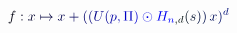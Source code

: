 \documentclass[12pt]{article}
\begin{document}
\makeatletter
\renewcommand*{\@textcolor}[3]{%
  \protect\leavevmode
  \begingroup
    \color#1{#2}#3%
  \endgroup
}
\makeatother
\begin{displaymath}
\mathcolor[RGB]{0,0,15}{f} \mathcolor[RGB]{0,0,30}{:} \mathcolor[RGB]{0,0,45}{x} \mathcolor[RGB]{0,0,60}{\mapsto} \mathcolor[RGB]{0,0,75}{x} \mathcolor[RGB]{0,0,90}{+} \mathcolor[RGB]{0,0,105}{(} \mathcolor[RGB]{0,0,120}{(} \mathcolor[RGB]{0,0,135}{U} \mathcolor[RGB]{0,0,150}{(} \mathcolor[RGB]{0,0,165}{p} \mathcolor[RGB]{0,0,180}{,} \mathcolor[RGB]{0,0,195}{\Pi} \mathcolor[RGB]{0,0,210}{)} \mathcolor[RGB]{0,0,225}{\odot} \mathcolor[RGB]{0,0,240}{H} _ { \mathcolor[RGB]{0,0,255}{n} \mathcolor[RGB]{0,15,0}{,} \mathcolor[RGB]{0,15,15}{d} } \mathcolor[RGB]{0,15,30}{(} \mathcolor[RGB]{0,15,45}{s} \mathcolor[RGB]{0,15,60}{)} \mathcolor[RGB]{0,15,75}{)} \, \mathcolor[RGB]{0,15,90}{x} \mathcolor[RGB]{0,15,105}{)} ^ { \mathcolor[RGB]{0,15,120}{d} }
\end{displaymath}
\end{document}

